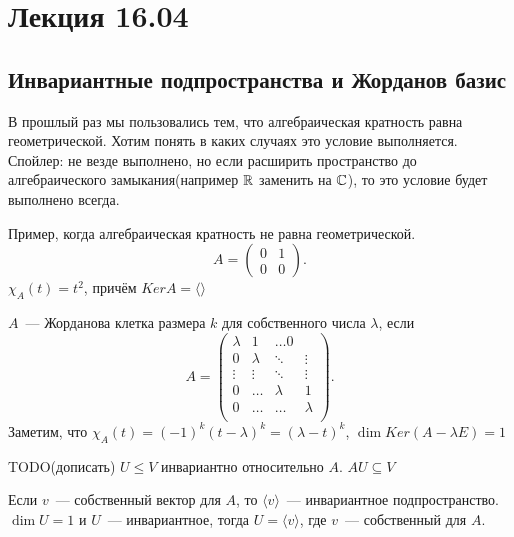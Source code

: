 \section{Лекция 16.04}
\subsection{Инвариантные подпространства и Жорданов базис}
\begin{motivation}
    В прошлый раз мы пользовались тем, что алгебраическая кратность равна геометрической. Хотим понять в каких случаях это условие
    выполняется. Спойлер: не везде выполнено, но если расширить пространство до алгебраического замыкания(например $\mathbb{R}$ заменить на $\mathbb{C}$),
    то это условие будет выполнено всегда.
\end{motivation}
\begin{example}
    Пример, когда алгебраическая кратность не равна геометрической.
     \[
         A = 
         \begin{pmatrix}
             0 & 1\\
             0 & 0
         \end{pmatrix}
    .\] 
    $\chi_A(t) = t^2$, причём $Ker A = \langle\rangle$
\end{example}
\begin{definition}
    $A$~--- Жорданова клетка размера $k$ для собственного числа $\lambda$, если
     \[
         A = 
         \begin{pmatrix}
             \lambda & 1 & \dots 0\\
             0 & \lambda & \ddots & \vdots\\
             \vdots&\vdots&\ddots&\vdots\\
             0 & \dots & \lambda & 1\\
             0 & \dots & \dots & \lambda\\
         \end{pmatrix}
    .\] 
    Заметим, что $\chi_A(t) = (-1)^k(t-\lambda)^k= (\lambda-t)^k$,  $\dim Ker(A - \lambda E) = 1$
\end{definition}
\begin{definition}
    TODO(дописать)
    $U\le V$ инвариантно относительно $A$. $AU \subseteq V$
\end{definition}
\begin{remark}
    Если $v$~--- собственный вектор для $A$, то $\langle v \rangle$~--- инвариантное подпространство.
    $\dim U = 1$ и $U$~--- инвариантное, тогда $U = \langle v\rangle$, где  $v$~--- собственный для $A$.
\end{remark}
